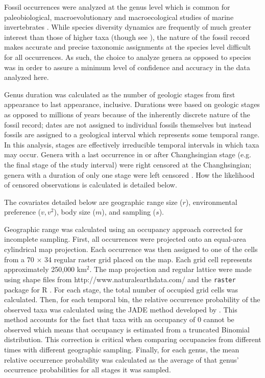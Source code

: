 \documentclass{article}
\begin{document}
Fossil occurrences were analyzed at the genus level which is common for paleobiological, macroevolutionary and macroecological studies of marine invertebrates \citep{Alroy2010,Foote2013,Harnik2013,Kiessling2007a,Miller2009a,Nurnberg2013a,Nurnberg2015,Payne2007,Simpson2009,Vilhena2013}. While species diversity dynamics are frequently of much greater interest than those of higher taxa (though see \citealt{Foote2014b,Hoehn2015}), the nature of the fossil record makes accurate and precise taxonomic assignments at the species level difficult for all occurrences. As such, the choice to analyze genera as opposed to species was in order to assure a minimum level of confidence and accuracy in the data analyzed here.

Genus duration was calculated as the number of geologic stages from first appearance to last appearance, inclusive. Durations were based on geologic stages as opposed to millions of years because of the inherently discrete nature of the fossil record; dates are not assigned to individual fossils themselves but instead fossils are assigned to a geological interval which represents some temporal range. In this analysis, stages are effectively irreducible temporal intervals in which taxa may occur. Genera with a last occurrence in or after Changhsingian stage (e.g. the final stage of the study interval) were right censored at the Changhsingian; genera with a duration of only one stage were left censored \citep{Klein2003}. How the likelihood of censored observations is calculated is detailed below.

The covariates detailed below are geographic range size (\(r\)), environmental preference (\(v, v^{2}\)), body size (\(m\)), and sampling (\(s\)).

Geographic range was calculated using an occupancy approach corrected for incomplete sampling. First, all occurrences were projected onto an equal-area cylindrical map projection. Each occurrence was then assigned to one of the cells from a 70 \(\times\) 34 regular raster grid placed on the map. Each grid cell represents approximately 250,000 km\(^{2}\). The map projection and regular lattice were made using shape files from http://www.naturalearthdata.com/ and the \texttt{raster} package for R \citep{raster}. For each stage, the total number of occupied grid cells was calculated. Then, for each temporal bin, the relative occurrence probability of the observed taxa was calculated using the \uppercase{jade} method developed by \citet{Chao2015a}. This method accounts for the fact that taxa with an occupancy of 0 cannot be observed which means that occupancy is estimated from a truncated Binomial distribution. This correction is critical when comparing occupancies from different times with different geographic sampling. Finally, for each genus, the mean relative occurrence probability was calculated as the average of that genus' occurrence probabilities for all stages it was sampled.
\end{document}
